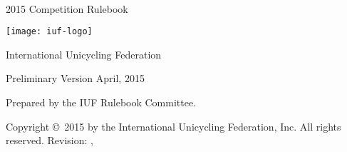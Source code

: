 




\begin{titlepage}
\centering
\ \\
\vspace{5cm}
{\Huge 2015 Competition Rulebook}
\vspace{5mm}

\texttt{[image: iuf-logo]}

\vspace{5mm}
{\huge International Unicycling Federation}

\vspace{5mm}
{\Large Preliminary Version \quad April, 2015}

\vspace{55mm}
Prepared by the IUF Rulebook Committee.

\vspace{5mm}
{\small Copyright \copyright\ 2015 by the International Unicycling Federation, Inc. All rights reserved.}
\small{Revision: \gitHash, \gitCommitterDate}

\end{titlepage}

\doparttoc
\tableofcontents

\mainmatter











\backmatter



